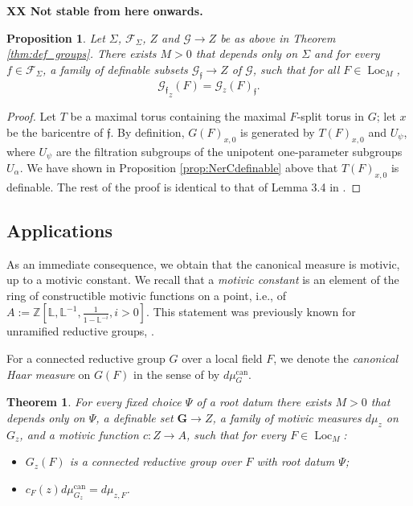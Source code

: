 \documentclass{amsart}
\newcommand{\Z}{{\mathbb Z}}
\newcommand{\cF}{\mathcal{F}}
\newcommand{\loc}{\operatorname{Loc}}
\newcommand{\bG}{\mathbf{G}}
\newcommand{\can}{\mathrm{can}}
\newcommand{\cG}{\mathcal{G}}
\newcommand{\ff}{{\mathfrak f}}
\newcommand\lef{\mathbb L}
\theoremstyle{plain}
\newtheorem{theorem}[thm]{Theorem}
\newtheorem{prop}[thm]{Proposition}
\theoremstyle{definition}
\begin{document}
{\bf XX Not stable from here onwards.}

\begin{prop} Let $\Sigma$, $\cF_\Sigma$, $Z$ and $\cG\to Z$ be as above in Theorem \ref{thm:def_groups}. 
There exists $M>0$ that depends only on $\Sigma$ and for every $f\in \cF_\Sigma$, a family of definable subsets $\cG_{\ff} \to Z$ of $\cG$, such that for all $F\in \loc_M$, 
$${\cG_{\ff}}_{z}(F)= \cG_z(F)_{\ff}.$$
\end{prop}

\begin{proof} Let $T$ be a maximal torus containing the maximal $F$-split torus in $G$; let $x$ be the baricentre of $\ff$.
By definition, $G(F)_{x,0}$ is generated by $T(F)_{x, 0}$ and $U_\psi$, where $U_\psi$ are the filtration subgroups of the unipotent one-parameter subgroups $U_{\alpha}$. 
We have shown in Proposition \ref{prop:NerCdefinable} above that  $T(F)_{x, 0}$ is definable. The rest of the proof is identical to that of Lemma 3.4 in \cite{CGH-2}.  
\end{proof} 

\subsection{Applications} 
As an immediate consequence, we obtain that the canonical measure is motivic, up to a motivic constant. 
We recall that a \emph{motivic constant} is an element of the ring of constructible motivic functions on a point, i.e.,  of $A:=\Z[\lef, \lef^{-1}, \frac{1}{1-\lef^{-i}}, i>0]$. 
This statement was previously known for unramified reductive groups, \cite{cluckers-hales-loeser}. 

For a connected reductive group $G$ over a local field $F$, we denote the \emph{canonical Haar measure} on $G(F)$ in the sense of \cite{gross:motive} by $d\mu_G^\can$. 
\begin{theorem} For every fixed choice $\Psi$ of a root datum there exists $M>0$ that depends only on 
$\Psi$, a  definable set $\bG \to Z$, a family of  motivic measures $d\mu_z$ on $G_z$, and a motivic function $c:Z\to A$, such that for every $F\in \loc_M$: 
\begin{itemize} 
\item $G_z(F)$ is a connected reductive group over $F$ with root datum $\Psi$;
\item $c_F(z) d\mu_{G_z}^\can = d\mu_{z, F}$.
 \end{itemize} 
\end{theorem} 




\begin{bibdiv}
\begin{biblist}
\end{biblist}
\end{bibdiv}
\end{document}
